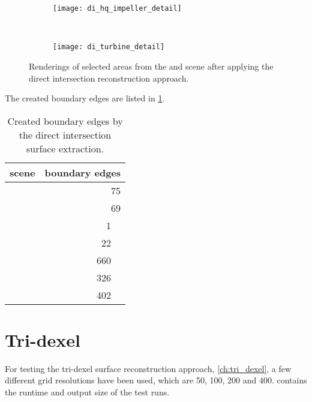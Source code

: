 \begin{figure}
	\centering
	\begin{subfigure}[b]{\textwidth}
		\centering
		\texttt{[image: di\_hq\_impeller\_detail]}
		\caption{\impeller}
		\label{fig:di_impeller_detail}
	\end{subfigure}\\
	\begin{subfigure}[b]{\textwidth}
		\centering
		\texttt{[image: di\_turbine\_detail]}
		\caption{\turbine}
		\label{fig:di_turbine_detail}
	\end{subfigure}
	\caption[Direct intersection artifacts]{
		Renderings of selected areas from the \impeller {} and \turbine {} scene after applying the direct intersection reconstruction approach.
	}
	\label{fig:di_scenes_artifacts}
\end{figure}

The created boundary edges are listed in \cref{tbl:direct_intersection_boundary_edges}.

\begin{table}
	\centering
	\begin{tabular}{l|r}
		scene         &  boundary edges         \\
		\midrule
		\cubes        & \SI{ 75}{     \nothing} \\
		\cylindersd   & \SI{ 69}{     \nothing} \\
		\cylinders    & \SI{  1}{\kilo\nothing} \\ %
		\cylinderhead & \SI{ 22}{\kilo\nothing} \\ %
		\impeller     & \SI{660}{\kilo\nothing} \\ %
		\impellerhalf & \SI{326}{\kilo\nothing} \\ %
		\turbine      & \SI{402}{\kilo\nothing} \\ %
	\end{tabular}
	\caption[Direct intersection boundary edges]{
		Created boundary edges by the direct intersection surface extraction.
	}
	\label{tbl:direct_intersection_boundary_edges}
\end{table}


\section{Tri-dexel}
\label{sec:tri_dexel_results}

For testing the tri-dexel surface reconstruction approach, \cf \cref{ch:tri_dexel}, a few different grid resolutions have been used, which are 50, 100, 200 and 400.
 contains the runtime and output size of the test runs.

